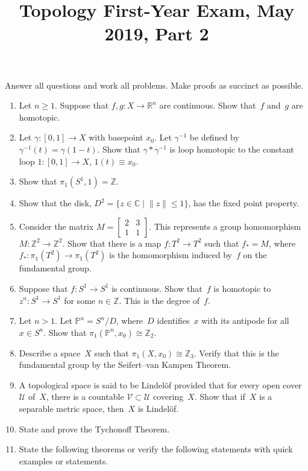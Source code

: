 \documentclass[11pt,letterpaper]{article}
\title{Topology First-Year Exam, May 2019, Part 2}
\author{}
\date{}
\newenvironment{examproblems}[2]{%
  \def\ProblemHeadingTag{#2}%
  \AssignTaggingSocketPlug{block/list/label}{examproblem}%
  \begin{enumerate}%
  \setcounter{enumi}{#1}%
  \renewcommand{\labelenumi}{\textbf{\theenumi.}}%
  \setlength{\topsep}{0.35em}%
  \setlength{\partopsep}{0pt}%
  \setlength{\itemsep}{0.48em}%
  \setlength{\parsep}{0.18em}%
}{\end{enumerate}}
\newenvironment{examinstructions}{%
  \par\begingroup\itshape
}{%
  \par\endgroup\vspace{0.18em}
}
\begin{document}
\maketitle
\thispagestyle{empty}
\begin{examinstructions}
Answer all questions and work all problems. Make proofs as succinct as possible.
\end{examinstructions}
\begin{examproblems}{0}{H2}
\def\ProblemHeadingText{Problem 1.}
\item
Let \(n \ge 1\). Suppose that \(f,g:X\to\mathbb{R}^n\) are continuous. Show that~\(f\) and~\(g\) are homotopic.
\def\ProblemHeadingText{Problem 2.}
\item
Let \(\gamma:[0,1]\to X\) with basepoint \(x_0\). Let \(\gamma^{-1}\) be defined by \(\gamma^{-1}(t)=\gamma(1-t)\). Show that \(\gamma\ast\gamma^{-1}\) is loop homotopic to the constant loop \(1:[0,1]\to X\), \(1(t)\equiv x_0\).
\def\ProblemHeadingText{Problem 3.}
\item
Show that \(\pi_1(S^1,1)=\mathbb{Z}\).
\def\ProblemHeadingText{Problem 4.}
\item
Show that the disk, \(D^2=\{z\in\mathbb{C}\mid \lVert z\rVert\le 1\}\), has the fixed point property.
\def\ProblemHeadingText{Problem 5.}
\item
Consider the matrix \(M=\begin{bmatrix}2&3\\1&1\end{bmatrix}\). This represents a group homomorphism \(M:\mathbb{Z}^2\to\mathbb{Z}^2\). Show that there is a map \(f:T^2\to T^2\) such that \(f_*=M\), where \(f_*:\pi_1(T^2)\to\pi_1(T^2)\) is the homomorphism induced by~\(f\) on the fundamental group.
\def\ProblemHeadingText{Problem 6.}
\item
Suppose that \(f:S^1\to S^1\) is continuous. Show that~\(f\) is homotopic to \(z^n:S^1\to S^1\) for some \(n\in\mathbb{Z}\). This is the degree of~\(f\).
\def\ProblemHeadingText{Problem 7.}
\item
Let \(n>1\). Let \(\mathbb{P}^n=S^n/D\), where~\(D\) identifies~\(x\) with its antipode for all \(x\in S^n\). Show that \(\pi_1(\mathbb{P}^n,x_0)\cong\mathbb{Z}_2\).
\def\ProblemHeadingText{Problem 8.}
\item
Describe a space~\(X\) such that \(\pi_1(X,x_0)\cong\mathbb{Z}_3\). Verify that this is the fundamental group by the Seifert–van Kampen Theorem.
\def\ProblemHeadingText{Problem 9.}
\item
A topological space is said to be Lindelöf provided that for every open cover~\(\mathcal{U}\) of~\(X\), there is a countable \(\mathcal{V}\subset\mathcal{U}\) covering~\(X\). Show that if~\(X\) is a separable metric space, then~\(X\) is Lindelöf.
\def\ProblemHeadingText{Problem 10.}
\item
State and prove the Tychonoff Theorem.
\def\ProblemHeadingText{Problem 11.}
\item
State the following theorems or verify the following statements with quick examples or statements.


\end{examproblems}
\end{document}
